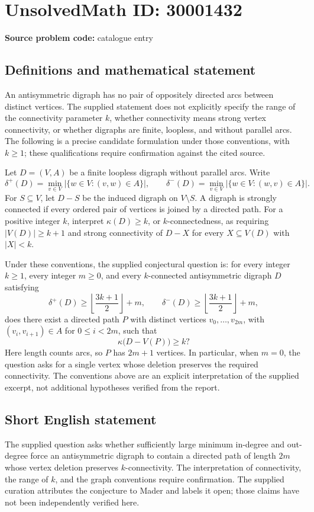 \documentclass[11pt]{article}
\begin{document}
\section*{UnsolvedMath ID: 30001432}
\textbf{Source problem code:} catalogue entry
\subsection{Definitions and mathematical statement}
An antisymmetric digraph has no pair of oppositely directed arcs between distinct vertices. The supplied statement does not explicitly specify the range of the connectivity parameter \(k\), whether connectivity means strong vertex connectivity, or whether digraphs are finite, loopless, and without parallel arcs. The following is a precise candidate formulation under those conventions, with \(k\geq 1\); these qualifications require confirmation against the cited source.

Let \(D=(V,A)\) be a finite loopless digraph without parallel arcs. Write
\[
\delta^+(D)=\min_{v\in V}|\{w\in V:(v,w)\in A\}|,
\qquad
\delta^-(D)=\min_{v\in V}|\{w\in V:(w,v)\in A\}|.
\]
For \(S\subseteq V\), let \(D-S\) be the induced digraph on \(V\setminus S\). A digraph is strongly connected if every ordered pair of vertices is joined by a directed path. For a positive integer \(k\), interpret \(\kappa(D)\geq k\), or \(k\)-connectedness, as requiring \(|V(D)|\geq k+1\) and strong connectivity of \(D-X\) for every \(X\subseteq V(D)\) with \(|X|<k\).

Under these conventions, the supplied conjectural question is: for every integer \(k\geq 1\), every integer \(m\geq 0\), and every \(k\)-connected antisymmetric digraph \(D\) satisfying
\[
\delta^+(D)\geq\left\lfloor\frac{3k+1}{2}\right\rfloor+m,
\qquad
\delta^-(D)\geq\left\lfloor\frac{3k+1}{2}\right\rfloor+m,
\]
does there exist a directed path \(P\) with distinct vertices \(v_0,\ldots,v_{2m}\), with \((v_i,v_{i+1})\in A\) for \(0\leq i<2m\), such that
\[
\kappa\bigl(D-V(P)\bigr)\geq k?
\]
Here length counts arcs, so \(P\) has \(2m+1\) vertices. In particular, when \(m=0\), the question asks for a single vertex whose deletion preserves the required connectivity. The conventions above are an explicit interpretation of the supplied excerpt, not additional hypotheses verified from the report.
\subsection{Short English statement}
The supplied question asks whether sufficiently large minimum in-degree and out-degree force an antisymmetric digraph to contain a directed path of length \(2m\) whose vertex deletion preserves \(k\)-connectivity. The interpretation of connectivity, the range of \(k\), and the graph conventions require confirmation. The supplied curation attributes the conjecture to Mader and labels it open; those claims have not been independently verified here.
\end{document}
